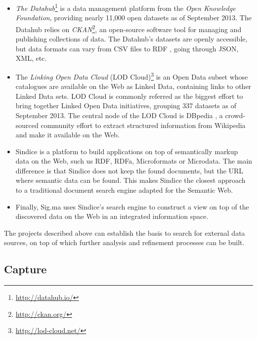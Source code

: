 \begin{itemize}
    \item \textit{The Datahub}\footnote{\url{http://datahub.io/}} is a data management  platform from the \textit{Open Knowledge Foundation}, providing nearly 11,000 open datasets as of September 2013. The Datahub relies on \textit{CKAN}\footnote{\url{http://ckan.org/}}, an open-source software tool for managing and publishing collections of data. The Datahub's datasets are openly accessible, but data formats can vary from CSV files to RDF , going through JSON, XML, etc.
    \item The \textit{Linking Open Data Cloud} (LOD Cloud)\footnote{\url{http://lod-cloud.net/}} is an Open Data subset whose catalogues are available on the Web as Linked Data, containing links to other Linked Data sets. LOD Cloud is commonly referred as the biggest effort to bring together Linked Open Data initiatives, grouping 337 datasets as of September 2013. The central node of the LOD Cloud is DBpedia \cite{auer2007dbpedia,bizer2009dbpedia}, a crowd-sourced community effort to extract structured information from Wikipedia and make it available on the Web.
    \item Sindice \cite{tummarello2007sindice} is a platform to build applications on top of semantically markup data on the Web, such us RDF, RDFa, Microformats or Microdata. The main difference is that Sindice does not keep the found documents, but the URL where semantic data can be found. This makes Sindice the closest approach to a traditional document search engine adapted for the Semantic Web.
    \item Finally, Sig.ma \cite{tummarello2010sig} uses Sindice's search engine to construct a view on top of the discovered data on the Web in an integrated information space.
\end{itemize}

The projects described above can establish the basis to search for external data sources, on top of which further analysis and refinement processes can be built.

\subsection{Capture}
\label{sec:capture}

